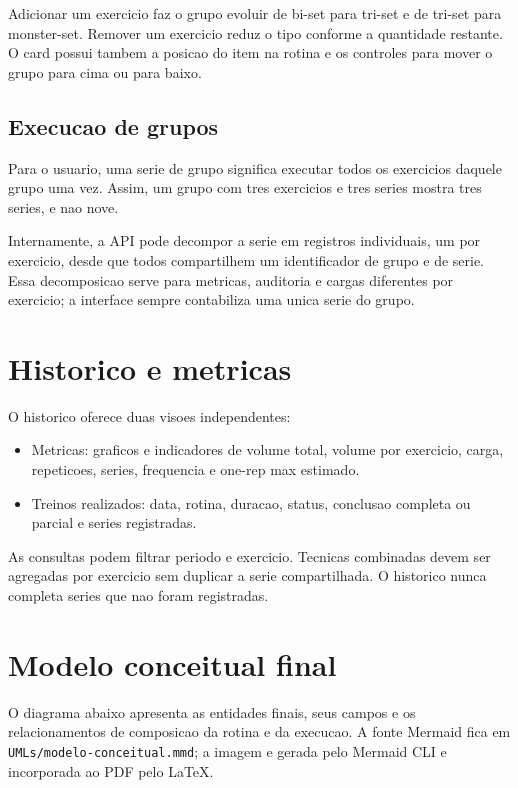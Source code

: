 \documentclass[12pt,a4paper]{article}
\begin{document}
Adicionar um exercicio faz o grupo evoluir de bi-set para tri-set e de tri-set para monster-set. Remover um exercicio reduz o tipo conforme a quantidade restante. O card possui tambem a posicao do item na rotina e os controles para mover o grupo para cima ou para baixo.

\subsection{Execucao de grupos}

Para o usuario, uma serie de grupo significa executar todos os exercicios daquele grupo uma vez. Assim, um grupo com tres exercicios e tres series mostra tres series, e nao nove.

Internamente, a API pode decompor a serie em registros individuais, um por exercicio, desde que todos compartilhem um identificador de grupo e de serie. Essa decomposicao serve para metricas, auditoria e cargas diferentes por exercicio; a interface sempre contabiliza uma unica serie do grupo.

\section{Historico e metricas}

O historico oferece duas visoes independentes:

\begin{itemize}[leftmargin=*]
    \item Metricas: graficos e indicadores de volume total, volume por exercicio, carga, repeticoes, series, frequencia e one-rep max estimado.
    \item Treinos realizados: data, rotina, duracao, status, conclusao completa ou parcial e series registradas.
\end{itemize}

As consultas podem filtrar periodo e exercicio. Tecnicas combinadas devem ser agregadas por exercicio sem duplicar a serie compartilhada. O historico nunca completa series que nao foram registradas.

\section{Modelo conceitual final}

O diagrama abaixo apresenta as entidades finais, seus campos e os relacionamentos de composicao da rotina e da execucao. A fonte Mermaid fica em \texttt{UMLs/modelo-conceitual.mmd}; a imagem e gerada pelo Mermaid CLI e incorporada ao PDF pelo LaTeX.
\end{document}
